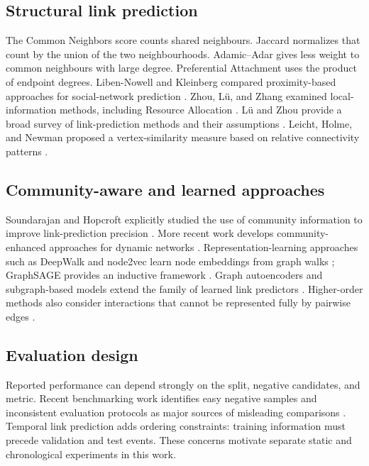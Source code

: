 \documentclass[11pt,a4paper]{article}
\begin{document}
\subsection{Structural link prediction}
The Common Neighbors score counts shared neighbours. Jaccard normalizes that count by the union of the two neighbourhoods. Adamic--Adar gives less weight to common neighbours with large degree. Preferential Attachment uses the product of endpoint degrees. Liben-Nowell and Kleinberg compared proximity-based approaches for social-network prediction \citep{liben2007link}. Zhou, Lü, and Zhang examined local-information methods, including Resource Allocation \citep{zhou2009predicting}. Lü and Zhou provide a broad survey of link-prediction methods and their assumptions \citep{lu2011survey}. Leicht, Holme, and Newman proposed a vertex-similarity measure based on relative connectivity patterns \citep{leicht2006vertex}.

\subsection{Community-aware and learned approaches}
Soundarajan and Hopcroft explicitly studied the use of community information to improve link-prediction precision \citep{soundarajan2012using}. More recent work develops community-enhanced approaches for dynamic networks \citep{kumar2024community}. Representation-learning approaches such as DeepWalk and node2vec learn node embeddings from graph walks \citep{perozzi2014deepwalk,grover2016node2vec}; GraphSAGE provides an inductive framework \citep{hamilton2017inductive}. Graph autoencoders and subgraph-based models extend the family of learned link predictors \citep{kipf2016variational,zhang2018seal}. Higher-order methods also consider interactions that cannot be represented fully by pairwise edges \citep{benson2018simplicial}.

\subsection{Evaluation design}
Reported performance can depend strongly on the split, negative candidates, and metric. Recent benchmarking work identifies easy negative samples and inconsistent evaluation protocols as major sources of misleading comparisons \citep{li2023evaluating}. Temporal link prediction adds ordering constraints: training information must precede validation and test events. These concerns motivate separate static and chronological experiments in this work.
\end{document}
